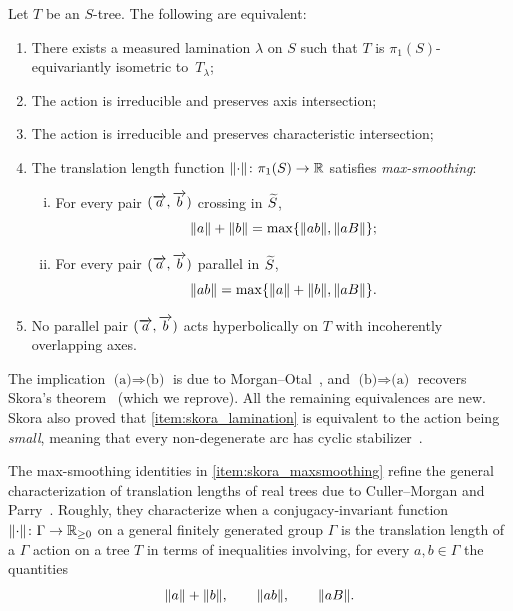 \begin{mainthm}
\label{mainthm:skora}
Let $T$ be an $S$-tree. The following are equivalent:
\begin{enumerate}[label=(\alph*),ref=\themainthm(\alph*)]
\item\label{item:skora_lamination}
There exists a measured lamination $\lambda$ on $S$ such that
$T$ is $\pi_1(S)$-equivariantly isometric to~$T_\lambda$;
\item\label{item:skora_axis}
The action is irreducible and preserves axis intersection;
\item\label{item:skora_characteristic}
The action is irreducible and preserves characteristic intersection;
\item\label{item:skora_maxsmoothing}
The translation length function
$\lVert\cdot\rVert\colon \pi_1(S)\to\mathbb{R}$ satisfies \emph{max-smoothing}:
\begin{enumerate}[(i)]
\item\label{item:skora_maxsmoothing_crossing}
For every pair $(\overrightarrow{a},\overrightarrow{b})$ crossing in $\widetilde{S}$,
\begin{equation}
\lVert a\rVert+\lVert b\rVert
=
\max\{\lVert ab\rVert,\lVert aB\rVert\};
\label{eq:small_disconn}
\end{equation}
\item\label{item:skora_maxsmoothing_parallel}
For every pair $(\overrightarrow{a},\overrightarrow{b})$ parallel in $\widetilde{S}$,
\begin{equation}
\lVert ab\rVert
=
\max\{\lVert a\rVert+\lVert b\rVert,\lVert aB\rVert\}.
\label{eq:small_conn}
\end{equation}
\end{enumerate}
\item\label{item:skora_incoherent}
  No parallel pair $(\overrightarrow{a},\overrightarrow{b})$ acts hyperbolically on $T$ with incoherently overlapping axes.
\end{enumerate}
\end{mainthm}

The implication $\text{(a)} \Rightarrow \text{(b)}$ is due to
Morgan--Otal~\cite{MO93:RelativeGrowths}, and
$\text{(b)} \Rightarrow \text{(a)}$ recovers
Skora’s theorem~\cite{Sko90:GeometricAction} (which we reprove).
All the remaining equivalences are new. Skora also proved that \ref{item:skora_lamination} is equivalent to the action being \emph{small}, meaning that every non-degenerate arc has cyclic stabilizer~\cite{Sk96:Splittings}.

The max-smoothing identities in \ref{item:skora_maxsmoothing} refine the general characterization of translation lengths of real trees due to Culler--Morgan and Parry~\cite{CM87:GroupActions,Par91:Translation}. Roughly, they characterize when a conjugacy-invariant
function $\lVert\cdot\rVert\colon\Gamma\to\mathbb{R}_{\geq 0}$ on a general finitely generated group $\Gamma$ is the translation length
of a $\Gamma$ action on a tree $T$ in terms of inequalities involving, for every $a,b\in\Gamma$ the quantities
\[
\lVert a\rVert+\lVert b\rVert, \qquad \lVert ab\rVert, \qquad \lVert aB\rVert.
\]


